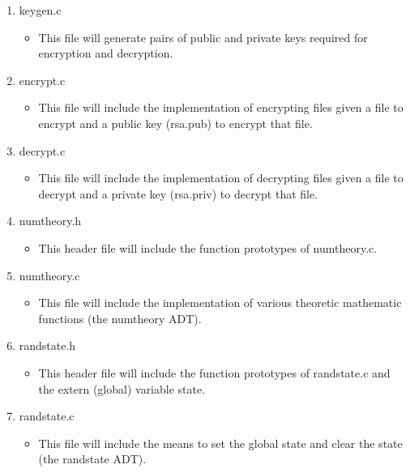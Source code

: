 \documentclass[
	12pt, %
]{fphw}
\begin{document}
\begin{enumerate}
	\item keygen.c
	\begin{itemize}
		\item This file will generate pairs of public and private keys required for encryption and decryption.
	\end{itemize}
	
	\item encrypt.c
	\begin{itemize}
		\item This file will include the implementation of encrypting files given a file to encrypt and a public key (rsa.pub) to encrypt that file.
	\end{itemize}
	
	\item decrypt.c
	\begin{itemize}
		\item This file will include the implementation of decrypting files given a file to decrypt and a private key (rsa.priv) to decrypt that file.
	\end{itemize}
	
	\item numtheory.h
	\begin{itemize}
		\item This header file will include the function prototypes of numtheory.c.
	\end{itemize}
	
	\item numtheory.c
	\begin{itemize}
		\item This file will include the implementation of various theoretic mathematic functions (the numtheory ADT).
	\end{itemize}
	
	\item randstate.h
	\begin{itemize}
		\item This header file will include the function prototypes of randstate.c and the extern (global) variable state.
	\end{itemize}
	
	\item randstate.c
	\begin{itemize}
		\item This file will include the means to set the global state and clear the state (the randstate ADT).
	\end{itemize}
		

\end{enumerate}
\end{document}
